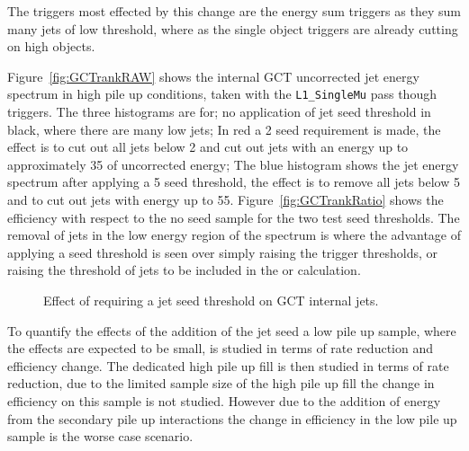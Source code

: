 The triggers most effected by this change are the energy sum triggers as they 
sum many jets of low threshold, where as the single object triggers are already 
cutting on high \ET objects.

Figure~\ref{fig:GCTrankRAW} shows the internal GCT uncorrected jet energy 
spectrum in high pile up conditions, taken with the \verb|L1_SingleMu| pass 
though triggers. The three histograms are for; no application of jet seed 
threshold in black, where there are many low \ET jets; In red a \unit{2}{\GeV} 
seed requirement is made, the effect is to cut out all jets below 
\unit{2}{\GeV} and cut out jets with an energy up to approximately 
\unit{35}{\GeV} of uncorrected energy; The blue histogram shows the jet energy 
spectrum after applying a \unit{5}{\GeV} seed threshold, the effect is to 
remove all jets below \unit{5}{\GeV} and to cut out jets with energy up to 
\unit{55}{\GeV}. Figure~\ref{fig:GCTrankRatio} shows the efficiency with 
respect to the no seed sample for the two test seed thresholds. The removal of 
jets in the low energy region of the \ET spectrum is where the advantage of 
applying a seed threshold is seen over simply raising the trigger thresholds, 
or raising the threshold of jets to be included in the \Lone \HT or \HTm
calculation.


\begin{figure}[h!]
    \centering
    \caption{Effect of requiring a jet seed threshold on GCT internal jets.}
    \label{fig:GCTrank}
\end{figure}



To quantify the effects of the addition of the jet seed a low pile up sample, 
where the effects are expected to be small, is studied in terms of rate 
reduction and efficiency change. The dedicated high pile up fill is then 
studied in terms of rate reduction, due to the limited sample size of the high 
pile up fill the change in efficiency on this sample is not studied. However 
due to the addition of energy from the secondary pile up interactions the 
change in efficiency in the low pile up sample is the worse case scenario.

